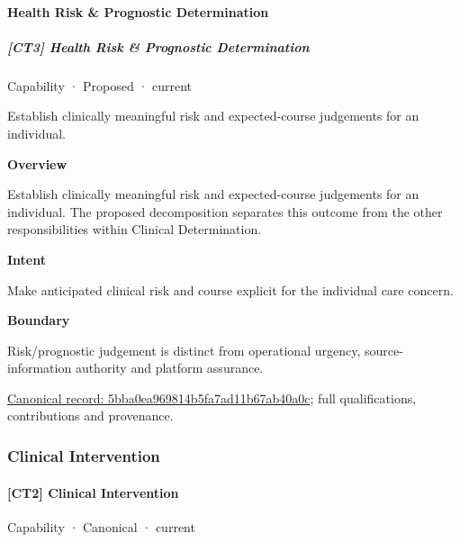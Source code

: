 \paragraph{Health Risk \& Prognostic Determination}

\subparagraph{[CT3] Health Risk \& Prognostic Determination}

\label{element:5bba0ea969814b5fa7ad11b67ab40a0c}
{\small Capability · Proposed · current}\par

Establish clinically meaningful risk and expected-course judgements for an individual.



\textbf{Overview}



Establish clinically meaningful risk and expected-course judgements for an individual. The proposed decomposition separates this outcome from the other responsibilities within Clinical Determination.



\textbf{Intent}



Make anticipated clinical risk and course explicit for the individual care concern.



\textbf{Boundary}



Risk/prognostic judgement is distinct from operational urgency, source-information authority and platform assurance.


{\footnotesize \href{../../../../continuum/strategy/capability/5bba0ea969814b5fa7ad11b67ab40a0c.md}{Canonical record: 5bba0ea969814b5fa7ad11b67ab40a0c}; full qualifications, contributions and provenance.}\par
\subsubsection{Clinical Intervention}

\paragraph{[CT2] Clinical Intervention}

\label{element:5359d1b0ff814a0e871384469f5ebcd7}
{\small Capability · Canonical · current}\par

